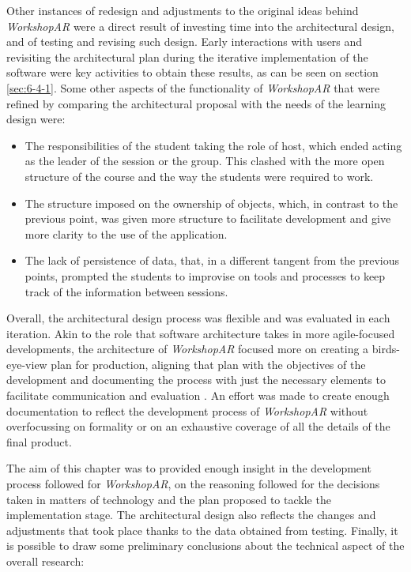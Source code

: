 Other instances of redesign and adjustments to the original ideas behind \emph{WorkshopAR} were a direct result of investing time into the architectural design, and of testing and
revising such design. Early interactions with users and revisiting the architectural plan during the iterative implementation of the software were key activities to obtain these results,
as can be seen on section \ref{sec:6-4-1}. Some other aspects of the functionality of \emph{WorkshopAR} that were refined by comparing the architectural proposal with
the needs of the learning design were:

\begin{itemize}
    \item The responsibilities of the student taking the role of host, which ended acting as the leader of the session or the group. This clashed with the more open structure of the
    course and the way the students were required to work.
    \item The structure imposed on the ownership of objects, which, in contrast to the previous point, was given more structure to facilitate development and give more clarity to the use
    of the application.
    \item The lack of persistence of data, that, in a different tangent from the previous points, prompted the students to improvise on tools and processes to keep track of the information
    between sessions.
\end{itemize}

Overall, the architectural design process was flexible and was evaluated in each iteration. Akin to the role that software architecture takes in more agile-focused developments, the
architecture of \emph{WorkshopAR} focused more on creating a birds-eye-view plan for production, aligning that plan with the objectives of the development and documenting the process with
just the necessary elements to facilitate communication and evaluation \parencite{babar_2009}. An effort was made to create enough documentation to reflect the development process of
\emph{WorkshopAR} without overfocussing on formality or on an exhaustive coverage of all the details of the final product.

The aim of this chapter was to provided enough insight in the development process followed for \emph{WorkshopAR}, on the reasoning followed for the decisions taken in matters of
technology and the plan proposed to tackle the implementation stage. The architectural design also reflects the changes and adjustments that took place thanks to the data obtained from
testing. Finally, it is possible to draw some preliminary conclusions about the technical aspect of the overall research:


